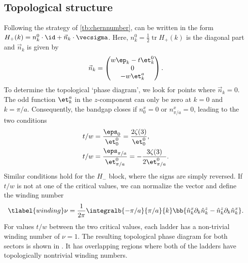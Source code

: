 \subsection{Topological structure}


Following the strategy of \cref{tb:chernnumber},  can be written in the form $H_+(k) = n^0_k \cdot \id + \vec{n}_k \cdot \vecsigma$. Here, $n^0_k = \frac{1}{2} \operatorname{tr} H_+(k)$ is the diagonal part and $\vec{n}_k$ is given by
\begin{align}
    \vec{n}_k = \begin{pmatrix}
        w \ep_k - t \et^0_k \\
        0 \\
        -w \et^a_k
    \end{pmatrix}.
\end{align}
To determine the topological `phase diagram', we look for points where $\vec{n}_k=0$.
The odd function $\et^a_k$ in the $z$-component can only be zero at $k = 0$ and $k=\pi/a$.
Consequently, the bandgap closes if $n^x_0 = 0$ or $n^x_{\pi/a} = 0$, leading to the two conditions
\begin{align}
    t/w  &= \frac{\eps_0}{\et^0_0} = \frac{2\zeta(3)}{\et^0_0}, \\
    t/w  &= \frac{\eps_{\pi/a}}{\et^0_{\pi/a}} = - \frac{3 \zeta(3)}{2 \et^0_{\pi/a}}.
\end{align}
Similar conditions hold for the $H_-$ block, where the signs are simply reversed.
If $t/w$ is not at one of the critical values, we can normalize the vector and define the winding number
\begin{align} \tlabel{winding}
    \nu = \frac{1}{2\pi} \integralb{-\pi/a}{\pi/a}{k} \bb{ \hat{n}^x_k \partial_k \hat{n}^z_k - \hat{n}^z_k \partial_k \hat{n}^x_k }.
\end{align}
For values $t/w$ between the two critical values, each ladder has a non-trivial winding number of $\nu = 1$.
The resulting topological phase diagram for both sectors is shown in .
It has overlapping regions where both of the ladders have topologically nontrivial winding numbers.


